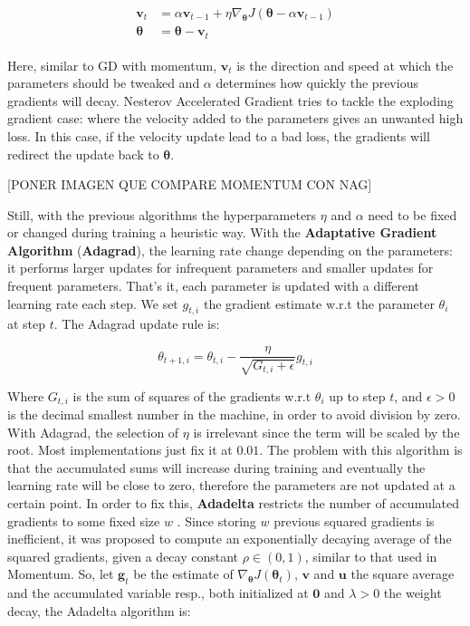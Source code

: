 \begin{align}
    \label{eqn:Nesterov_accelerated_gradient}
    \begin{split}
        \mathbf{v}_t &= \alpha \mathbf{v}_{t-1} + \eta \nabla_{\boldsymbol{\theta}} J(\boldsymbol{\theta} - \alpha \mathbf{v}_{t-1}) \\
        \boldsymbol{\theta} &= \boldsymbol{\theta} - \mathbf{v}_t
    \end{split}
\end{align}

Here, similar to GD with momentum, $\mathbf{v}_t$ is the direction and speed at which the parameters should be tweaked and $\alpha$ determines how quickly the previous gradients will decay. Nesterov Accelerated Gradient tries to tackle the exploding gradient case: where the velocity added to the parameters gives an unwanted high loss. In this case, if the velocity update lead to a bad loss, the gradients will redirect the update back to $\boldsymbol{\theta}$.

[PONER IMAGEN QUE COMPARE MOMENTUM CON NAG]

Still, with the previous algorithms the hyperparameters $\eta$ and $\alpha$ need to be fixed or changed during training a heuristic way. With the \textbf{Adaptative Gradient Algorithm} (\textbf{Adagrad}), the learning rate change depending on the parameters: it performs larger updates for infrequent parameters and smaller updates for frequent parameters. That's it, each parameter is updated with a different learning rate each step.
We set $g_{t,i}$ the gradient estimate w.r.t the parameter $\theta_i$ at step $t$. The Adagrad update rule is:

\begin{equation}
    \theta_{t+1, i} = \theta_{t,i} - \frac{\eta}{\sqrt{G_{t,i} + \epsilon}} g_{t,i}
\end{equation}

Where $G_{t,i}$ is the sum of squares of the gradients w.r.t $\theta_i$ up to step $t$, and $\epsilon > 0$ is the decimal smallest number in the machine, in order to avoid division by zero. With Adagrad, the selection of $\eta$ is irrelevant since the term will be scaled by the root. Most implementations just fix it at $0.01$. The problem with this algorithm is that the accumulated sums will increase during training and eventually the learning rate will be close to zero, therefore the parameters are not updated at a certain point.
In order to fix this, \textbf{Adadelta} restricts the number of accumulated gradients to some fixed size $w$ \cite{zeiler2012}. Since storing $w$ previous squared gradients is inefficient, it was proposed to compute an exponentially decaying average of the squared gradients, given a decay constant $\rho \in (0,1)$, similar to that used in Momentum. So, let $\mathbf{g}_t$ be the estimate of $\nabla_{\boldsymbol{\theta}} J(\boldsymbol{\theta}_t)$, $\mathbf{v}$ and $\mathbf{u}$ the square average and the accumulated variable resp., both initialized at $\mathbf{0}$ and $\lambda>0$ the weight decay, the Adadelta algorithm is:

